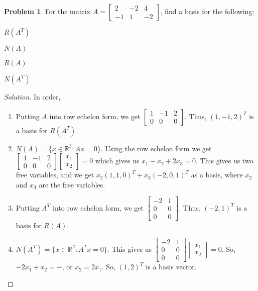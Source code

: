 \documentclass[oneside]{book}
\theoremstyle{definition}
\newtheorem{problem}{Problem}[section]
\begin{document}
\begin{problem}
For the matrix $A = \begin{bmatrix} 2 & -2 & 4 \\ -1 & 1 & -2 \end{bmatrix}$, find a basis for the following:
\begin{enumerate}
\begin{multicols}{4}
\item $R(A^T)$
\item $N(A)$
\item $R(A)$
\item $N(A^T)$
\end{multicols}
\end{enumerate}
\end{problem}
\begin{proof}[Solution]
In order,
\begin{enumerate}
\item Putting $A$ into row echelon form, we get $\begin{bmatrix} 1 & -1 & 2 \\ 0 & 0 & 0 \end{bmatrix}$. Thus, $(1,-1,2)^T$ is a basis for $R(A^T)$.
\item $N(A) = \{x\in \mathbb{R}^3: Ax = 0\}$. Using the row echelon form we get $\begin{bmatrix} 1 & -1 & 2 \\ 0 & 0 & 0 \end{bmatrix} \begin{bmatrix} x_1 \\ x_2 \end{bmatrix} = 0$ which gives us $x_1 - x_2 + 2x_3 = 0$. This gives us two free variables, and we get $x_2(1,1,0)^T + x_3(-2,0,1)^T$ as a basis, where $x_2$ and $x_3$ are the free variables.
\item Putting $A^T$ into row echelon form, we get $\begin{bmatrix} -2 & 1 \\ 0 & 0 \\ 0 & 0 \end{bmatrix}$. Thus, $(-2,1)^T$ is a basis for $R(A)$.
\item $N(A^T) = \{x\in \mathbb{R}^2: A^T x = 0\}$. This gives us $\begin{bmatrix} -2 & 1 \\ 0 & 0 \\ 0 & 0 \end{bmatrix} \begin{bmatrix} x_1 \\ x_2 \end{bmatrix} = 0$. So, $-2x_1 + x_2 = -$, or $x_2 = 2x_1$. So, $(1,2)^T$ is a basis vector.
\end{enumerate}
\end{proof}
\end{document}
